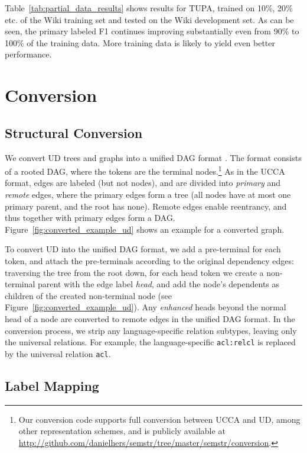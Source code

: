 \documentclass[11pt,a4paper]{article}
\begin{document}
Table~\ref{tab:partial_data_results} shows results for TUPA,
trained on 10\%, 20\% etc. of the Wiki training set and tested on the Wiki development set.
As can be seen, the primary labeled F1 continues improving substantially even from 90\% to 100\%
of the training data. More training data is likely to yield even better performance.

\section{Conversion}\label{sec:conversion}

\subsection{Structural Conversion}\label{sec:structural}

We convert UD trees and graphs into a unified DAG format \cite{hershcovich2018multitask,hershcovich2018universal}.
The format consists of a rooted DAG, where the tokens are the terminal
nodes.\footnote{Our conversion code supports full conversion between UCCA and UD,
among other representation schemes,
and is publicly available at \url{http://github.com/danielhers/semstr/tree/master/semstr/conversion}.}
As in the UCCA format, edges are labeled (but not nodes),
and are divided into \textit{primary} and \textit{remote} edges,
where the primary edges form a tree (all nodes have at most one primary parent,
and the root has none).
Remote edges enable reentrancy, and thus together with primary edges
form a DAG.
Figure~\ref{fig:converted_example_ud} shows an example for a converted graph.

To convert UD into the unified DAG format,
we add a pre-terminal for each token,
and attach the pre-terminals according to the original dependency edges:
traversing the tree from the root down, for each head token we create a non-terminal
parent with the edge label {\it head},
and add the node's dependents as children of the created non-terminal node
(see Figure~\ref{fig:converted_example_ud}).
Any \textit{enhanced}
heads beyond the normal head of a node are converted to remote edges in the unified DAG format.
In the conversion process, we strip any language-specific relation subtypes,
leaving only the universal relations.
For example, the language-specific \verb|acl:relcl| is replaced by the universal relation \verb|acl|.



\subsection{Label Mapping}\label{sec:mapping}
\end{document}
